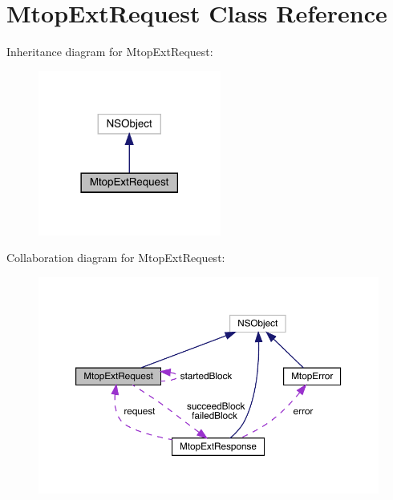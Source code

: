 \hypertarget{interface_mtop_ext_request}{}\section{Mtop\+Ext\+Request Class Reference}
\label{interface_mtop_ext_request}


Inheritance diagram for Mtop\+Ext\+Request\+:\nopagebreak
\begin{figure}[H]
\begin{center}
\leavevmode
\includegraphics[width=170pt]{interface_mtop_ext_request__inherit__graph}
\end{center}
\end{figure}


Collaboration diagram for Mtop\+Ext\+Request\+:\nopagebreak
\begin{figure}[H]
\begin{center}
\leavevmode
\includegraphics[width=350pt]{interface_mtop_ext_request__coll__graph}
\end{center}
\end{figure}
